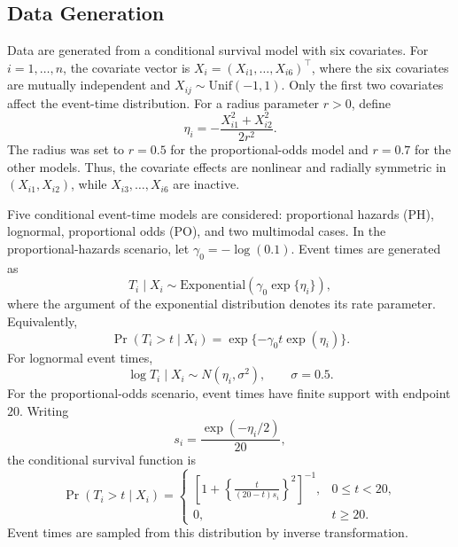 \documentclass[11pt]{article}
\numberwithin{equation}{section}
\begin{document}
\subsection{Data Generation}
Data are generated from a conditional survival model with six covariates. For $i=1,\ldots,n$, the covariate vector is $X_i=(X_{i1},\ldots,X_{i6})^\top$, where the six covariates are mutually independent and $X_{ij}\sim\mathrm{Unif}(-1,1)$. Only the first two covariates affect the event-time distribution. For a radius parameter $r>0$, define
\begin{equation}
    \eta_i=-\frac{X_{i1}^2+X_{i2}^2}{2r^2}.
    \label{eq:data-generation-predictor}
\end{equation}
The radius was set to $r=0.5$ for the proportional-odds model and $r=0.7$ for the other models. Thus, the covariate effects are nonlinear and radially symmetric in $(X_{i1},X_{i2})$, while $X_{i3},\ldots,X_{i6}$ are inactive. 

Five conditional event-time models are considered: proportional hazards (PH), lognormal, proportional odds (PO), and two multimodal cases. In the proportional-hazards scenario, let $\gamma_0=-\log(0.1)$. Event times are generated as
\begin{equation}
    T_i\mid X_i
    \sim \mathrm{Exponential}\left(\gamma_0\exp\{\eta_i\}\right),
    \label{eq:ph-data-generation}
\end{equation}
where the argument of the exponential distribution denotes its rate parameter. Equivalently,
\[
    \Pr(T_i>t\mid X_i)
    =\exp\{-\gamma_0 t\exp(\eta_i)\}.
\]
For lognormal event times,
\begin{equation}
    \log T_i\mid X_i
    \sim N(\eta_i,\sigma^2),
    \qquad \sigma=0.5.
    \label{eq:lognormal-data-generation}
\end{equation}
For the proportional-odds scenario, event times have finite support with endpoint $20$. Writing
\[
    s_i=\frac{\exp(-\eta_i/2)}{20},
\]
the conditional survival function is
\begin{equation}
    \Pr(T_i>t\mid X_i)
    =
    \begin{cases}
    \displaystyle
    \left[
    1+\left\{\frac{t}{(20-t)s_i}\right\}^{2}
    \right]^{-1},
    &0\leq t<20,\\[8pt]
    0,&t\geq 20.
    \end{cases}
    \label{eq:po-data-generation}
\end{equation}
Event times are sampled from this distribution by inverse transformation.
\end{document}
